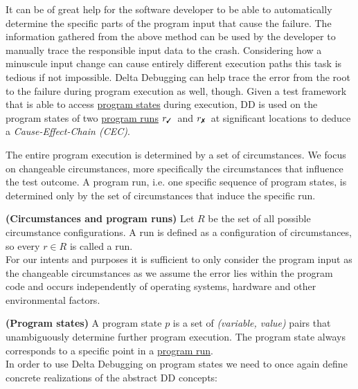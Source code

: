 \documentclass[a4paper,UKenglish]{lipics-v2018}
\newcommand{\cmark}{\text{\ding{51}}}
\newcommand{\xmark}{\text{\ding{55}}}
\newcommand{\defsub}[1]{\textbf{(#1)} }
\newcommand{\rpass}[0]{\ensuremath{r_{\cmark}}}
\newcommand{\rfail}[0]{\ensuremath{r_{\xmark}}}
\begin{document}
It can be of great help for the software developer to be able to automatically determine the specific parts of the program input that cause the failure. The information gathered from the above method can be used by the developer to manually trace the responsible input data to the crash. Considering how a minuscule input change can cause entirely different execution paths this task is tedious if not impossible.
Delta Debugging can help trace the error from the root to the failure during program execution as well, though. Given a test framework that is able to access \hyperref[def:program_state]{program states} during execution, DD is used on the program states of two \hyperref[def:program_run]{program runs} \rpass\ and \rfail\ at significant locations to deduce a \textit{Cause-Effect-Chain (CEC)}.

The entire program execution is determined by a set of circumstances. We focus on changeable circumstances, more specifically the circumstances that influence the test outcome. A program run, i.e. one specific sequence of program states, is determined only by the set of circumstances that induce the specific run.

 \label{def:program_run} \defsub{Circumstances and program runs} Let $R$ be the set of all possible circumstance configurations. A run is defined as a configuration of circumstances, so every $r \in R$ is called a run.\\

For our intents and purposes it is sufficient to only consider the program input as the changeable circumstances as we assume the error lies within the program code and occurs independently of operating systems, hardware and other environmental factors.  

 \label{def:program_state} \defsub{Program states} A program state $p$ is a set of \textit{(variable, value)} pairs that unambiguously determine further program execution. The program state always corresponds to a specific point in a \hyperref[def:program_run]{program run}.\\

In order to use Delta Debugging on program states we need to once again define concrete realizations of the abstract DD concepts:
\end{document}
